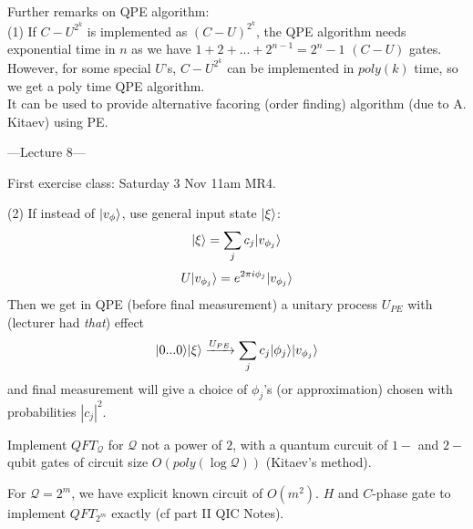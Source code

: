 \documentclass[a4paper]{article}
\begin{document}
Further remarks on QPE algorithm:\\
(1) If $C-U^{2^k}$ is implemented as $(C-U)^{2^k}$, the QPE algorithm needs exponential time in $n$ as we have $1+2+...+2^{n-1} = 2^n-1$ $(C-U)$ gates.\\
However, for some special $U$'s, $C-U^{2^k}$ can be implemented in $poly(k)$ time, so we get a poly time QPE algorithm.\\
It can be used to provide alternative facoring (order finding) algorithm (due to A. Kitaev) using PE.

---Lecture 8---

First exercise class: Saturday 3 Nov 11am MR4.

(2) If instead of $|v_\phi\rangle$, use general input state $|\xi\rangle$:
$$|\xi \rangle = \sum_j c_j | v_{\phi_j}\rangle$$
$$U|v_{\phi_j} \rangle = e^{2\pi i \phi_j} | v_{\phi_j} \rangle$$
Then we get in QPE (before final measurement) a unitary process $U_{PE}$ with (lecturer had \emph{that}) effect
$$|0...0\rangle | \xi\rangle \xrightarrow{U_{PE}} \sum_j c_j | \phi_j\rangle |v_{\phi_j}\rangle$$
and final measurement will give a choice of $\phi_j$'s (or approximation) chosen with probabilities $|c_j|^2$.

\begin{eg}
    Implement $QFT_{\mathcal{Q}}$ for $\mathcal{Q}$ not a power of $2$, with a quantum curcuit of $1-$ and $2-$ qubit gates of circuit size $O(poly(\log \mathcal{Q}))$ (Kitaev's method).
\end{eg}

\begin{rem}
    For $\mathcal{Q}=2^m$, we have explicit known circuit of $O(m^2)$. $H$ and $C$-phase gate to implement $QFT_{2^m}$ exactly (cf part II QIC Notes).
\end{rem}
\end{document}
